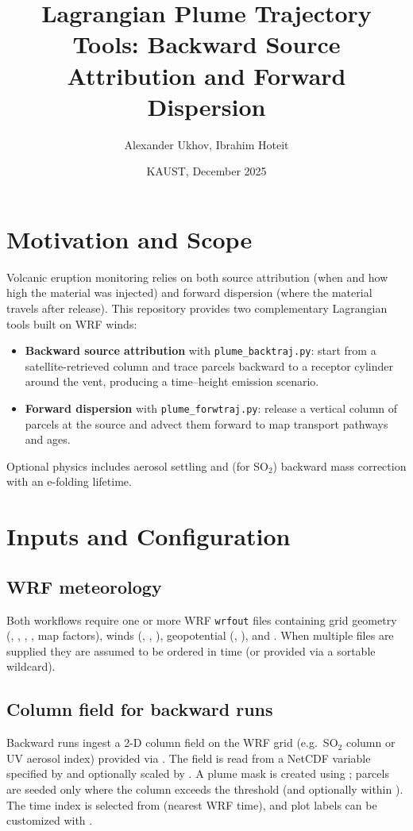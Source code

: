 \documentclass[11pt]{article}
\title{Lagrangian Plume Trajectory Tools: Backward Source Attribution and Forward Dispersion}
\author{Alexander Ukhov, Ibrahim Hoteit}
\date{KAUST, December 2025}
\begin{document}
\maketitle

\section{Motivation and Scope}
Volcanic eruption monitoring relies on both source attribution (when and how high
the material was injected) and forward dispersion (where the material travels
after release). This repository provides two complementary Lagrangian tools
built on WRF winds:
\begin{itemize}
  \item \textbf{Backward source attribution} with \texttt{plume\_backtraj.py}:
        start from a satellite-retrieved column and trace parcels backward to a
        receptor cylinder around the vent, producing a time--height emission
        scenario.
  \item \textbf{Forward dispersion} with \texttt{plume\_forwtraj.py}: release a
        vertical column of parcels at the source and advect them forward to map
        transport pathways and ages.
\end{itemize}
Optional physics includes aerosol settling and (for SO$_2$) backward mass
correction with an e-folding lifetime.

\section{Inputs and Configuration}
\subsection{WRF meteorology}
Both workflows require one or more WRF \texttt{wrfout} files containing grid
geometry (, , , , map factors), winds
(, , ), geopotential (, ), and
. When multiple files are supplied they are assumed to be ordered in
time (or provided via a sortable wildcard).

\subsection{Column field for backward runs}
Backward runs ingest a 2-D column field on the WRF grid (e.g.\ SO$_2$ column or
UV aerosol index) provided via . The field is read from a NetCDF
variable specified by  and optionally scaled by
. A plume mask is created using ; parcels
are seeded only where the column exceeds the threshold (and optionally within
). The time index is selected from  (nearest
WRF time), and plot labels can be customized with .
\end{document}
